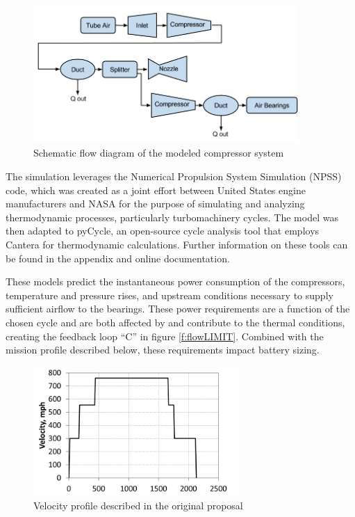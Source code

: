 \documentclass[heading.tex]{subfiles}
\begin{document}
\begin{figure}[hbtp]
\centering
\includegraphics[width=0.9\textwidth]{images/compressor_schematic.png}
\caption{Schematic flow diagram of the modeled compressor system}
\label{f:comp}
\end{figure}

The simulation leverages the Numerical Propulsion System Simulation (NPSS) code, which
was created as a joint effort between United States engine manufacturers and NASA
for the purpose of simulating and analyzing thermodynamic processes, particularly turbomachinery cycles. \cite{Lytle}
The model was then adapted to pyCycle, an open-source cycle analysis tool that employs Cantera for thermodynamic calculations.
Further information on these tools can be found in the appendix and online documentation. \cite{goodwin2009cantera}

These models predict the instantaneous power consumption of the compressors, temperature and pressure rises,
and upstream conditions necessary to supply sufficient airflow to the bearings.
These power requirements are a function of the chosen cycle and are both affected by
and contribute to the thermal conditions, creating the feedback loop “C” in figure \ref{f:flowLIMIT}.
Combined with the mission profile described below, these requirements impact battery sizing.

\begin{figure}[hbtp]
\centering
\includegraphics[width=0.7\textwidth]{images/velocity_profile.png}
\caption{Velocity profile described in the original proposal}
\label{f:velocity}
\end{figure}
\end{document}
